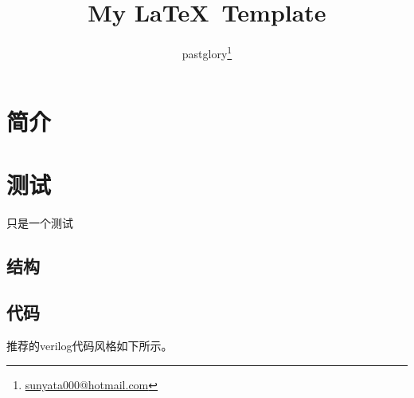 \documentclass[zh, a4paper, 12pt]{pgreport}
\title {My \LaTeX\ Template}
\author{pastglory\thanks{\href{mailto:sunyata000@hotmail.com}{sunyata000@hotmail.com}}}
\date{}
\begin{document}
\maketitle
\tableofcontents
\begin{abstract}

\end{abstract}

\section{简介}


\section{测试}
只是一个测试

\subsection{结构}


\subsection{代码}
推荐的verilog代码风格如下所示。



\end{document}
